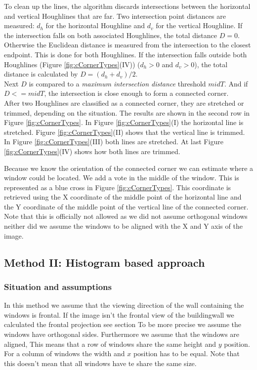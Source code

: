 To clean up the lines, the algorithm discards intersections between the
horizontal and vertical Houghlines that are far. 
Two intersection point distances are measured: $d_h$ for the horizontal Houghline and $d_v$
for the vertical Houghline.  If the intersection falls on both associated Houghlines,
	the total distance $D=0$.  Otherwise the Euclidean distance is measured from the
	intersection to the closest endpoint. This is done for both Houghlines.  If
	the intersection falls outside both Houghlines (Figure
	\ref{fig:cCornerTypes}(IV)) ($d_h>0$ and $d_v>0$), the total
	distance is calculated by $D=(d_h + d_v)/2$.\\
	Next $D$ is compared to
	a \emph{maximum intersection distance} threshold $midT$.  And if $D<=midT$,
	the intersection is close enough to form a connected corner.\\

After two Houghlines are classified as a connected corner, they are stretched or
trimmed, depending on the situation. The results are shown in the second row in
Figure \ref{fig:cCornerTypes}.
In Figure \ref{fig:cCornerTypes}(I)  the horizontal line is stretched.  Figure
\ref{fig:cCornerTypes}(II) shows that the vertical line is trimmed.  In Figure
\ref{fig:cCornerTypes}(III) both lines are stretched.  At last Figure
\ref{fig:cCornerTypes}(IV) shows how both lines are trimmed.


Because we know the orientation of the connected corner we can estimate where
a window could be located.  We add a vote in the middle of the window. 
This is represented as a blue cross in Figure \ref{fig:cCornerTypes}.
This coordinate is retrieved using the X coordinate of the middle point of the horizontal line
and the Y coordinate of the middle point of the vertical line of the connected corner.  
Note that this is officially not allowed as we did not assume orthogonal windows
neither did we assume the windows to be aligned with the X and Y axis of the
image.  



\subsection{Method II: Histogram based approach} 
\subsubsection{Situation and assumptions}
In this method we assume that the viewing direction of the wall containing the windows is frontal.
If the image isn't the frontal view of the buildingwall we calculated the frontal projection
see section %
To be more precise we assume the windows have orthogonal sides.  Furthermore we
assume that the windows are aligned, This means that a row of windows share the
same height and $y$ position. For a column of windows the width and $x$
position has to be equal.  Note that this doesn't mean that all windows have te
share the same size.


